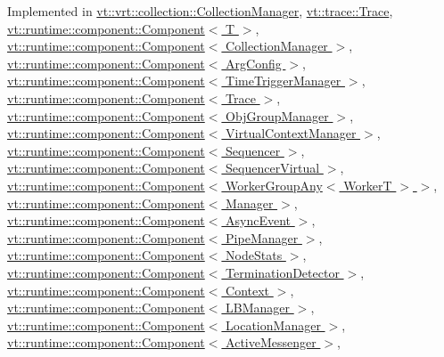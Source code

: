 Implemented in \hyperlink{structvt_1_1vrt_1_1collection_1_1_collection_manager_ac71095016a20dd9607f2f937bf35305e}{vt\+::vrt\+::collection\+::\+Collection\+Manager}, \hyperlink{structvt_1_1trace_1_1_trace_a5dd8767d9020ebeaba49ea3a684738a1}{vt\+::trace\+::\+Trace}, \hyperlink{structvt_1_1runtime_1_1component_1_1_component_aad3974307ab3b2e1df389a91310f68c2}{vt\+::runtime\+::component\+::\+Component$<$ T $>$}, \hyperlink{structvt_1_1runtime_1_1component_1_1_component_aad3974307ab3b2e1df389a91310f68c2}{vt\+::runtime\+::component\+::\+Component$<$ Collection\+Manager $>$}, \hyperlink{structvt_1_1runtime_1_1component_1_1_component_aad3974307ab3b2e1df389a91310f68c2}{vt\+::runtime\+::component\+::\+Component$<$ Arg\+Config $>$}, \hyperlink{structvt_1_1runtime_1_1component_1_1_component_aad3974307ab3b2e1df389a91310f68c2}{vt\+::runtime\+::component\+::\+Component$<$ Time\+Trigger\+Manager $>$}, \hyperlink{structvt_1_1runtime_1_1component_1_1_component_aad3974307ab3b2e1df389a91310f68c2}{vt\+::runtime\+::component\+::\+Component$<$ Trace $>$}, \hyperlink{structvt_1_1runtime_1_1component_1_1_component_aad3974307ab3b2e1df389a91310f68c2}{vt\+::runtime\+::component\+::\+Component$<$ Obj\+Group\+Manager $>$}, \hyperlink{structvt_1_1runtime_1_1component_1_1_component_aad3974307ab3b2e1df389a91310f68c2}{vt\+::runtime\+::component\+::\+Component$<$ Virtual\+Context\+Manager $>$}, \hyperlink{structvt_1_1runtime_1_1component_1_1_component_aad3974307ab3b2e1df389a91310f68c2}{vt\+::runtime\+::component\+::\+Component$<$ Sequencer $>$}, \hyperlink{structvt_1_1runtime_1_1component_1_1_component_aad3974307ab3b2e1df389a91310f68c2}{vt\+::runtime\+::component\+::\+Component$<$ Sequencer\+Virtual $>$}, \hyperlink{structvt_1_1runtime_1_1component_1_1_component_aad3974307ab3b2e1df389a91310f68c2}{vt\+::runtime\+::component\+::\+Component$<$ Worker\+Group\+Any$<$ Worker\+T $>$ $>$}, \hyperlink{structvt_1_1runtime_1_1component_1_1_component_aad3974307ab3b2e1df389a91310f68c2}{vt\+::runtime\+::component\+::\+Component$<$ Manager $>$}, \hyperlink{structvt_1_1runtime_1_1component_1_1_component_aad3974307ab3b2e1df389a91310f68c2}{vt\+::runtime\+::component\+::\+Component$<$ Async\+Event $>$}, \hyperlink{structvt_1_1runtime_1_1component_1_1_component_aad3974307ab3b2e1df389a91310f68c2}{vt\+::runtime\+::component\+::\+Component$<$ Pipe\+Manager $>$}, \hyperlink{structvt_1_1runtime_1_1component_1_1_component_aad3974307ab3b2e1df389a91310f68c2}{vt\+::runtime\+::component\+::\+Component$<$ Node\+Stats $>$}, \hyperlink{structvt_1_1runtime_1_1component_1_1_component_aad3974307ab3b2e1df389a91310f68c2}{vt\+::runtime\+::component\+::\+Component$<$ Termination\+Detector $>$}, \hyperlink{structvt_1_1runtime_1_1component_1_1_component_aad3974307ab3b2e1df389a91310f68c2}{vt\+::runtime\+::component\+::\+Component$<$ Context $>$}, \hyperlink{structvt_1_1runtime_1_1component_1_1_component_aad3974307ab3b2e1df389a91310f68c2}{vt\+::runtime\+::component\+::\+Component$<$ L\+B\+Manager $>$}, \hyperlink{structvt_1_1runtime_1_1component_1_1_component_aad3974307ab3b2e1df389a91310f68c2}{vt\+::runtime\+::component\+::\+Component$<$ Location\+Manager $>$}, \hyperlink{structvt_1_1runtime_1_1component_1_1_component_aad3974307ab3b2e1df389a91310f68c2}{vt\+::runtime\+::component\+::\+Component$<$ Active\+Messenger $>$}, 
